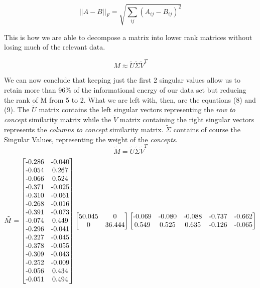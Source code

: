 \documentclass[10pt]{article}
\theoremstyle{plain}
\theoremstyle{definition}
\begin{document}
\begin{equation}
    ||A-B||_F = \sqrt{\sum_{ij}(A_{ij}-B_{ij})^2}
\end{equation}

This is how we are able to decompose a matrix into lower rank matrices without losing much of the relevant data.

\begin{equation}
M \approx \tilde{U} \tilde{\Sigma} \tilde{V}^T
\end{equation}

We can now conclude that keeping just the first 2 singular values allow us to retain more than 96\% of the informational energy of our data set but reducing the rank of M from 5 to 2. 
\newpage
What we are left with, then, are the equations (8) and (9). The $\tilde{U}$ matrix contains the left singular vectors representing the \textit{row to concept} similarity matrix while the $\tilde{V}$ matrix containing the right singular vectors represents the \textit{columns to concept} similarity matrix. $\tilde{\Sigma}$ contains of course the Singular Values, representing the weight of the \textit{concepts}.
\begin{equation}
\tilde{M} = \tilde{U} \tilde{\Sigma} \tilde{V}^T
\end{equation}
\begin{equation}
\tilde{M} =
\begin{bmatrix}
$-0.286$ & $-0.040$ \\ 
$-0.054$ & $0.267$ \\ 
$-0.066$ & $0.524$ \\ 
$-0.371$ & $-0.025$ \\ 
$-0.310$ & $-0.061$ \\ 
$-0.268$ & $-0.016$ \\ 
$-0.391$ & $-0.073$ \\ 
$-0.074$ & $0.449$ \\ 
$-0.296$ & $-0.041$ \\ 
$-0.227$ & $-0.045$ \\ 
$-0.378$ & $-0.055$ \\ 
$-0.309$ & $-0.043$ \\ 
$-0.252$ & $-0.009$ \\ 
$-0.056$ & $0.434$ \\ 
$-0.051$ & $0.494$ \\ 
\end{bmatrix} 
\begin{bmatrix}
$50.045$ & $0$ \\ 
$0$ & $36.444$ \\ 
\end{bmatrix}%
\begin{bmatrix}
$-0.069$ & $-0.080$ & $-0.088$ & $-0.737$ & $-0.662$ \\ 
$0.549$ & $0.525$ & $0.635$ & $-0.126$ & $-0.065$ \\ 
\end{bmatrix}
\end{equation}
\end{document}
